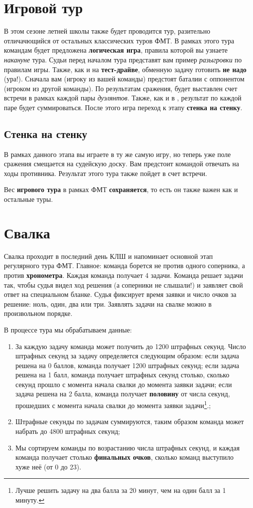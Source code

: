 \documentclass[12pt]{article}
\begin{document}
\section*{Игровой тур}
В этом сезоне летней школы также будет проводится тур, разительно отличачющийся от остальных классических туров ФМТ. В рамках этого тура командам будет предложена \textbf{логическая игра}, правила которой вы узнаете {\it накануне} тура. Судьи перед началом тура представят вам пример {\it разыгровки} по правилам игры. Также, как и на {\bf тест-драйве}, обменную задачу готовить \textbf{не надо} (ура!). Сначала вам (игроку из вашей команды) предстоят баталии с оппонентом (игроком из другой команды). По результатам сражения, будет выставлен счет встречи в рамках каждой пары {\it дуэлянтов}. Также, как и в , результат по каждой паре будет суммироваться. После этого игра переход к этапу \textbf{стенка на стенку}.
\subsection*{Стенка на стенку}
В рамках данного этапа вы играете в ту же самую игру, но теперь уже поле сражения смещается на судейскую доску. Вам предстоит командой отвечать на ходы противника. Результат этого тура также пойдет в счет встречи.

Вес \textbf{игрового тура} в рамках ФМТ \textbf{сохраняется}, то есть он также важен как и остальные туры.
\section*{Свалка}
Свалка проходит в последний день КЛШ и напоминает основной этап регулярного тура ФМТ. Главное: команда борется не против одного соперника, а против {\bf хронометра}. Каждая команда получает 4 задачи. Команда решает задачи так, чтобы судья видел ход решения (а соперники не слышали!) и заявляет свой ответ на специальном бланке. Судья фиксирует время заявки и число очков за решение: ноль, один, два или три. Заявлять задачи на свалке можно в произвольном порядке.

В процессе тура мы обрабатываем данные:
\begin{enumerate}
	\item За каждую задачу команда может получить до 1200 штрафных секунд. Число штрафных секунд за задачу определяется следующим образом: если задача решена на 0 баллов, команда получает 1200 штрафных секунд; если задача решена на 1 балл, команда получает штрафных секунд столько, сколько секунд прошло с момента начала свалки до момента заявки задачи; если задача решена на 2 балла, команда получает {\bf половину} от числа секунд, прошедших с момента начала свалки до момента заявки задачи\footnote{Лучше решить задачу на два балла за 20 минут, чем на один балл за 1 минуту.}.;
	\item Штрафные секунды по задачам суммируются, таким образом команда может набрать до 4800 штрафных секунд;
	\item Мы сортируем команды по возрастанию числа штрафных секунд, и каждая команда получает столько {\bf финальных очков}, сколько команд выступило хуже неё (от 0 до 23).
\end{enumerate}
\end{document}
